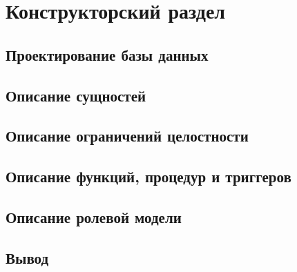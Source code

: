 \section{Конструкторский раздел}

\subsection{Проектирование базы данных}

\subsection{Описание сущностей}

\subsection{Описание ограничений целостности}

\subsection{Описание функций, процедур и триггеров}

\subsection{Описание ролевой модели}

\subsection{Вывод}
